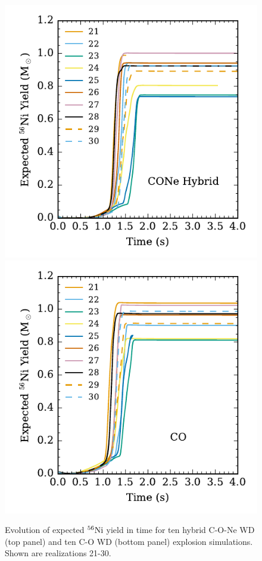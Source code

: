 \documentclass[iop,apj]{emulateapj}
\newcommand{\Ni}[1]{\ensuremath{{}^{#1}{\rm Ni}}}
\begin{document}
\begin{figure}
\includegraphics[width=\columnwidth]{figures/Hybrid_Ni56mass_v_time_plot.pdf}
\includegraphics[width=\columnwidth]{figures/CO_Ni56mass_v_time_plot.pdf}
\caption{\label{fig:nithybrid} \label{fig:nitco}
Evolution of expected \Ni{56} yield in time for ten hybrid C-O-Ne WD (top panel) and ten C-O WD (bottom panel) explosion simulations.
Shown are realizations 21-30.
}
\end{figure}
\end{document}
